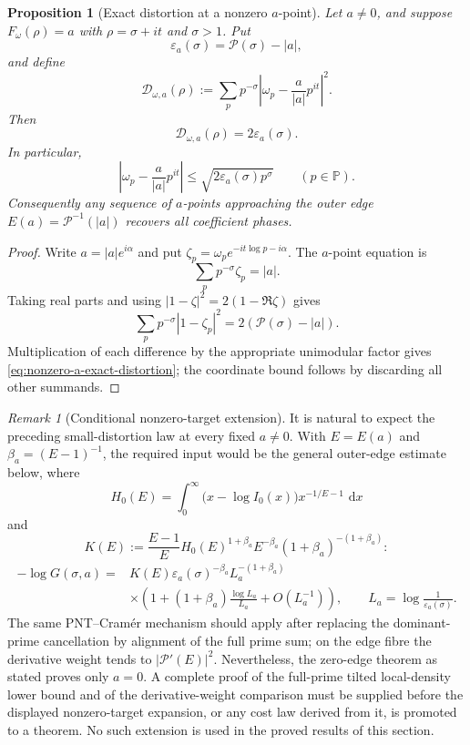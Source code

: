\documentclass[11pt]{article}
\newtheorem{proposition}[theorem]{Proposition}
\theoremstyle{definition}
\theoremstyle{remark}
\newtheorem{remark}[theorem]{Remark}
\newcommand{\PP}{\mathbb P}
\newcommand{\cP}{\mathcal P}
\newcommand{\dd}{\,\mathrm d}
\newcommand{\eps}{\varepsilon}
\begin{document}
\begin{proposition}[Exact distortion at a nonzero $a$-point]
\label{prop:nonzero-a-distortion}
Let $a\neq0$, and suppose
$F_\omega(\rho)=a$ with $\rho=\sigma+it$ and $\sigma>1$.  Put
\[
 \eps_a(\sigma)=\cP(\sigma)-|a|,
\]
and define
\[
 \mathcal D_{\omega,a}(\rho)
 :=\sum_p p^{-\sigma}
 \left|\omega_p-\frac a{|a|}p^{it}\right|^2.
\]
Then
\begin{equation}
\label{eq:nonzero-a-exact-distortion}
 \boxed{\mathcal D_{\omega,a}(\rho)=2\eps_a(\sigma).}
\end{equation}
In particular,
\begin{equation}
\label{eq:nonzero-a-coordinate}
 \left|\omega_p-\frac a{|a|}p^{it}\right|
 \leq\sqrt{2\eps_a(\sigma)p^\sigma}
 \qquad(p\in\PP).
\end{equation}
Consequently any sequence of $a$-points approaching the outer edge
$E(a)=\cP^{-1}(|a|)$ recovers all coefficient phases.
\end{proposition}

\begin{proof}
Write $a=|a|e^{i\alpha}$ and put
$\zeta_p=\omega_pe^{-it\log p-i\alpha}$.  The $a$-point equation is
\[
 \sum_pp^{-\sigma}\zeta_p=|a|.
\]
Taking real parts and using $|1-\zeta|^2=2(1-\Re\zeta)$ gives
\[
 \sum_pp^{-\sigma}|1-\zeta_p|^2
 =2(\cP(\sigma)-|a|).
\]
Multiplication of each difference by the appropriate unimodular factor gives
\eqref{eq:nonzero-a-exact-distortion}; the coordinate bound follows by
discarding all other summands.
\end{proof}

\begin{remark}[Conditional nonzero-target extension]
\label{rem:conditional-a-edge}
It is natural to expect the preceding small-distortion law at every fixed
$a\neq0$.  With $E=E(a)$ and $\beta_a=(E-1)^{-1}$, the required input would
be the general outer-edge estimate below, where
\[
 H_0(E)=\int_0^\infty
 \bigl(x-\log I_0(x)\bigr)x^{-1/E-1}\,\dd x
\]
and
\[
 K(E):=\frac{E-1}{E}H_0(E)^{1+\beta_a}E^{-\beta_a}
       (1+\beta_a)^{-(1+\beta_a)}:
\]
\begin{align*}
 -\log G(\sigma,a)
 ={}&K(E)\eps_a(\sigma)^{-\beta_a}L_a^{-(1+\beta_a)}
 \\
 &\times\left(1+(1+\beta_a)\frac{\log L_a}{L_a}
  +O(L_a^{-1})\right),
 \qquad L_a=\log\frac1{\eps_a(\sigma)}.
\end{align*}
The same PNT--Cram\'er mechanism should apply after replacing the
dominant-prime cancellation by alignment of the full prime sum; on the edge
fibre the derivative weight tends to $|\cP'(E)|^2$.  Nevertheless, the
zero-edge theorem as stated proves only $a=0$.  A complete proof of the
full-prime tilted local-density lower bound and of the derivative-weight
comparison must be supplied before the displayed nonzero-target expansion,
or any cost law derived from it, is promoted to a theorem.  No such extension
is used in the proved results of this section.
\end{remark}
\end{document}

